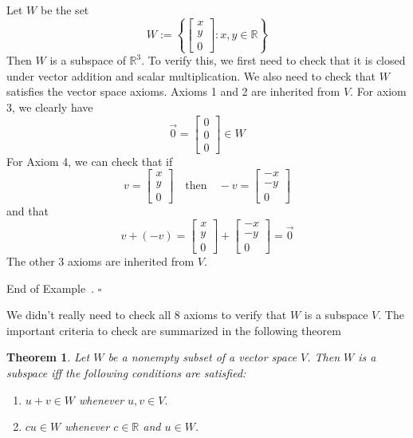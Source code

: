 \documentclass[10pt]{article}
\newtheorem{theorem}{Theorem}
\theoremstyle{definition}
\newtheorem{example}[theorem]{Example}
\renewenvironment{example}
{\begin{oldexample}}
  {\par\smallskip\hfill   End of Example~\theexample. $\square$    \par\end{oldexample}}
\newcommand{\R}{\mathbb{R}}           %
\begin{document}
\begin{example}
  Let $W$ be the set
  \begin{equation*}
    W:= \left\{
      \begin{bmatrix}
        x\\y\\0
      \end{bmatrix}: x,y\in \R
    \right\} 
  \end{equation*}
  Then $W$ is a subspace of $\R^{3}$. To verify this, we first need to check
  that it is closed under vector addition and scalar multiplication. We also
  need to check that $W$ satisfies the vector space axioms. Axioms 1 and 2 are
  inherited from $V$. For axiom 3, we clearly have
  \begin{equation*}
    \vec{0}=
    \begin{bmatrix}
      0\\0\\0
    \end{bmatrix}\in W
  \end{equation*}
  For Axiom 4, we can check that if
  \begin{equation*}
    v =
    \begin{bmatrix}
      x\\y\\0
    \end{bmatrix}
    \quad \text{then} \quad
    -v =
    \begin{bmatrix}
      -x\\-y\\0
    \end{bmatrix}
  \end{equation*}
  and that
  \begin{equation*}
    v+(-v) =     \begin{bmatrix}
      x\\y\\0
    \end{bmatrix}+    \begin{bmatrix}
      -x\\-y\\0
    \end{bmatrix}
    =
    \vec{0}
  \end{equation*}
  The other 3 axioms are inherited from $V$.
\end{example}

We didn't really need to check all 8 axioms to verify that $W$ is a subspace
$V$. The important criteria to check are summarized in the following theorem
\begin{theorem}
  Let $W$ be a nonempty subset of a vector space $V$. Then $W$ is a subspace
  iff the following conditions are satisfied:
  \begin{enumerate}[label=(\roman*.)]
    \item $u+v\in W$ whenever $u,v\in V.$
    \item $cu\in W$ whenever $c\in \R$ and $u\in W$.
  \end{enumerate}
\end{theorem}
\end{document}
